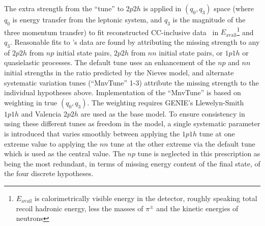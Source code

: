 The extra strength from the ``\minerva tune'' to $2p2h$ is applied in $(q_0,q_3)$ space (where $q_0$ is energy transfer from the leptonic system, and $q_3$ is the magnitude of the three momentum transfer) to fit reconstructed \minerva CC-inclusive data~\cite{Rodrigues:2015hik} in $E_\text{avail}$\footnote{$E_\text{avail}$ is calorimetrically visible energy in the detector, roughly speaking total recoil hadronic energy, less the masses of $\pi^\pm$ and the kinetic energies of neutrons} and $q_3$.  Reasonable fits to \minerva's data are found by attributing the missing strength to any of $2p2h$ from $np$ initial state pairs, $2p2h$ from $nn$ initial state pairs, or $1p1h$ or quasielastic processes.  The default tune uses an enhancement of the $np$ and $nn$ initial strengths in the ratio predicted by the Nieves model, and alternate systematic variation tunes (``MnvTune'' 1-3) attribute the missing strength to the individual hypotheses above. Implementation of the ``MnvTune'' is based on weighting in true $(q_0,q_3)$. The weighting requires GENIE's Llewelyn-Smith $1p1h$ and Valencia $2p2h$ are used as the base model. To ensure consistency in using these different tunes as freedom in the model, a single systematic parameter is introduced that varies smoothly between applying the $1p1h$ tune at one extreme value to applying the $nn$ tune at the other extreme via the default tune which is used as the central value. The $np$ tune is neglected in this prescription as being the most redundant, in terms of missing energy content of the final state, of the four discrete hypotheses.%


